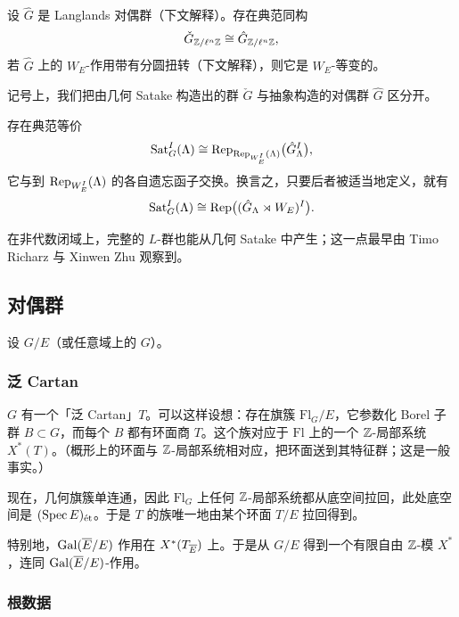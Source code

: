 \begin{theorem}
设 $\hat G$ 是 Langlands 对偶群（下文解释）。存在典范同构
\[
\check G_{\ZZ/\ell^n\ZZ}\cong\hat G_{\ZZ/\ell^n\ZZ},
\]
若 $\hat G$ 上的 $W_E$-作用带有分圆扭转（下文解释），则它是 $W_E$-等变的。
\end{theorem}

\begin{remark}
记号上，我们把由几何 Satake 构造出的群 $\check G$ 与抽象构造的对偶群 $\hat G$ 区分开。
\end{remark}


\begin{corollary}
存在典范等价
\[
\mathrm{Sat}^I_G(\Lambda)\cong\Rep_{\Rep_{W^I_E}(\Lambda)}\bigl(\hat G^I_\Lambda\bigr),
\]
它与到 $\Rep_{W^I_E}(\Lambda)$ 的各自遗忘函子交换。换言之，只要后者被适当地定义，就有
\[
\mathrm{Sat}^I_G(\Lambda)\cong\Rep\bigl((\hat G_\Lambda\rtimes W_E)^I\bigr).
\]
\end{corollary}

\begin{remark}
在非代数闭域上，完整的 $L$-群也能从几何 Satake 中产生；这一点最早由 Timo Richarz 与 Xinwen Zhu 观察到。
\end{remark}

\subsection{对偶群}

设 $G/E$（或任意域上的 $G$）。

\subsubsection{泛 Cartan}

$G$ 有一个「泛 Cartan」$T$。可以这样设想：存在旗簇 $\mathrm{Fl}_G/E$，它参数化 Borel 子群 $B\subset G$，而每个 $B$ 都有环面商 $T$。这个族对应于 $\mathrm{Fl}$ 上的一个 $\ZZ$-局部系统 $X^*(T)$。（概形上的环面与 $\ZZ$-局部系统相对应，把环面送到其特征群；这是一般事实。）

现在，几何旗簇单连通，因此 $\mathrm{Fl}_G$ 上任何 $\ZZ$-局部系统都从底空间拉回，此处底空间是 $(\Spec E)_{\et}$。于是 $T$ 的族唯一地由某个环面 $T/E$ 拉回得到。

特别地，$\Gal(\ol E/E)$ 作用在 $X^*(T_{\ol E})$ 上。于是从 $G/E$ 得到一个有限自由 $\ZZ$-模 $X^*$，连同 $\Gal(\ol E/E)$-作用。

\subsubsection{根数据}

